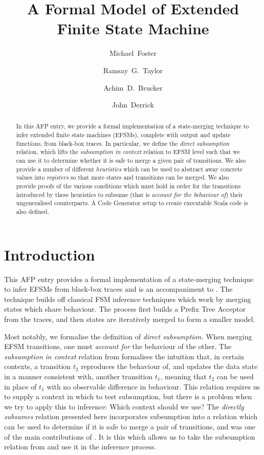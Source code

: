 \documentclass[10pt,DIV16,a4paper,abstract=true,twoside=semi,openright]{scrreprt}
\title{A Formal Model of Extended Finite State Machine}%
\author{Michael~Foster\orcidID{0000-0001-8233-9873} \and
 Ramsay~G.~Taylor\orcidID{0000-0002-4036-7590} \and
 Achim~D.~Brucker\orcidID{0000-0002-6355-1200} \and
 John~Derrick\orcidID{0000-0002-6631-8914}}
\begin{document}
\maketitle
\begin{abstract}
  In this AFP entry, we provide a formal implementation of a state-merging technique to infer extended finite state machines (EFSMs), complete with output and update functions, from black-box traces. In particular, we define the \emph{direct subsumption} relation, which lifts the \emph{subsumption in context} relation to EFSM level such that we can use it to determine whether it is safe to merge a given pair of transitions. We also provide a number of different \emph{heuristics} which can be used to abstract away concrete values into \emph{registers} so that more states and transitions can be merged. We also provide proofs of the various conditions which must hold in order for the transitions introduced by these heuristics to subsume (that is \emph{account for the behaviour of}) their ungeneralised counterparts. A Code Generator setup to create executable Scala code is also defined.
  \begin{quote}
    \bigskip
  \end{quote}
\end{abstract}


\tableofcontents
\cleardoublepage

\chapter{Introduction}\label{chap:intro}
This AFP entry provides a formal implementation of a state-merging technique to infer EFSMs from black-box traces and is an accompaniment to \cite{foster2019}. The technique builds off classical FSM inference techniques which work by merging states which share behaviour. The process first builds a Prefix Tree Acceptor from the traces, and then states are iteratively merged to form a smaller model.

Most notably, we formalise the definition of \emph{direct subsumption.} When merging EFSM transitions, one must \emph{account for} the behaviour of the other. The \emph{subsumption in context} relation from \cite{foster2018} formalises the intuition that, in certain contexts, a transition $t_2$ reproduces the behaviour of, and updates the data state in a manner consistent with, another transition $t_1$, meaning that $t_2$ can be used in place of $t_1$ with no observable difference in behaviour. This relation requires us to supply a context in which to test subsumption, but there is a problem when we try to apply this to inference: Which context should we use? The \emph{directly subsumes} relation presented here incorporates subsumption into a relation which can be used to determine if it is safe to merge a pair of transitions, and was one of the main contributions of \cite{foster2019}. It is this which allows us to take the subsumption relation from \cite{foster2018} and use it in the inference process.
\end{document}
